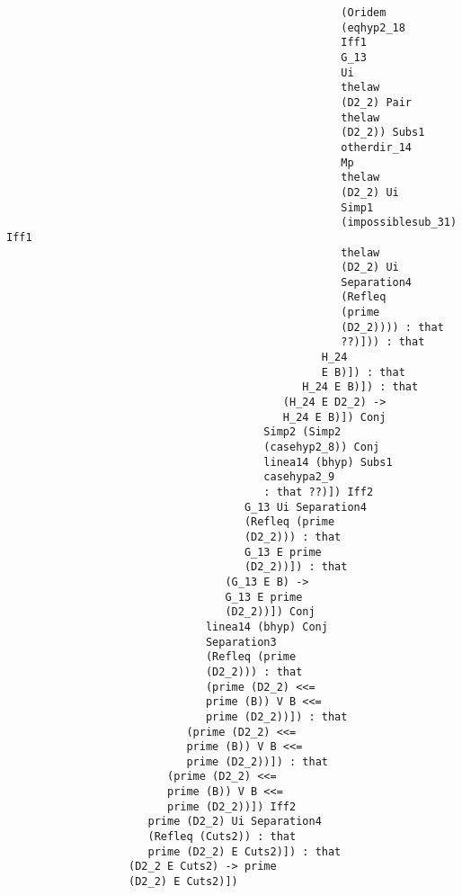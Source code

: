 \documentclass[12pt]{article}
\begin{document}
\begin{verbatim}
                                                    (Oridem 
                                                    (eqhyp2_18 
                                                    Iff1 
                                                    G_13 
                                                    Ui 
                                                    thelaw 
                                                    (D2_2) Pair 
                                                    thelaw 
                                                    (D2_2)) Subs1 
                                                    otherdir_14 
                                                    Mp 
                                                    thelaw 
                                                    (D2_2) Ui 
                                                    Simp1 
                                                    (impossiblesub_31) Iff1 
                                                    thelaw 
                                                    (D2_2) Ui 
                                                    Separation4 
                                                    (Refleq 
                                                    (prime 
                                                    (D2_2)))) : that 
                                                    ??)])) : that 
                                                 H_24 
                                                 E B)]) : that 
                                              H_24 E B)]) : that 
                                           (H_24 E D2_2) -> 
                                           H_24 E B)]) Conj 
                                        Simp2 (Simp2 
                                        (casehyp2_8)) Conj 
                                        linea14 (bhyp) Subs1 
                                        casehypa2_9 
                                        : that ??)]) Iff2 
                                     G_13 Ui Separation4 
                                     (Refleq (prime 
                                     (D2_2))) : that 
                                     G_13 E prime 
                                     (D2_2))]) : that 
                                  (G_13 E B) -> 
                                  G_13 E prime 
                                  (D2_2))]) Conj 
                               linea14 (bhyp) Conj 
                               Separation3 
                               (Refleq (prime 
                               (D2_2))) : that 
                               (prime (D2_2) <<= 
                               prime (B)) V B <<= 
                               prime (D2_2))]) : that 
                            (prime (D2_2) <<= 
                            prime (B)) V B <<= 
                            prime (D2_2))]) : that 
                         (prime (D2_2) <<= 
                         prime (B)) V B <<= 
                         prime (D2_2))]) Iff2 
                      prime (D2_2) Ui Separation4 
                      (Refleq (Cuts2)) : that 
                      prime (D2_2) E Cuts2)]) : that 
                   (D2_2 E Cuts2) -> prime 
                   (D2_2) E Cuts2)])



\end{verbatim}
\end{document}
